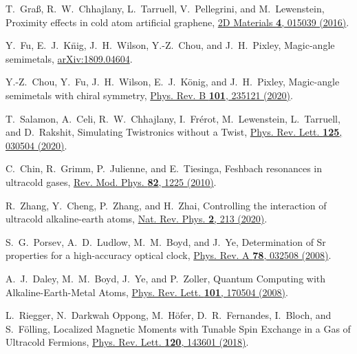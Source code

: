 \documentclass[twocolumn,english,prl,floatfix,citeautoscript,nofootinbib]{revtex4}
\begin{document}
\begin{thebibliography}{999}

 T.~Gra\ss {}, R.~W.~Chhajlany, L.~Tarruell,
V.~Pellegrini, and M.~Lewenstein, Proximity effects in cold atom artificial
graphene, \href{https://doi.org/10.1088/2053-1583/aa50c6}{2D Materials
\textbf{4}, 015039 (2016)}.

 Y.~Fu, E.~J.~K\"nig, J.~H.~Wilson, Y.-Z.~Chou,
and J.~H.~Pixley, Magic-angle semimetals, \href{https://arxiv.org/abs/1809.04604}%
{arXiv:1809.04604}.

 Y.-Z.~Chou, Y.~Fu, J.~H.~Wilson,
E.~J.~K\"onig, and J.~H.~Pixley, Magic-angle semimetals with chiral
symmetry, \href{https://doi.org/10.1103/PhysRevB.101.235121}{Phys. Rev. B
\textbf{101}, 235121 (2020)}.

 T.~Salamon, A.~Celi, R.~W.~Chhajlany,
I.~Fr\'erot, M.~Lewenstein, L.~Tarruell, and D.~Rakshit, Simulating
Twistronics without a Twist, \href{https://doi.org/10.1103/PhysRevLett.125.030504}%
{Phys. Rev. Lett. \textbf{125}, 030504 (2020)}.


 C.~Chin, R.~Grimm, P.~Julienne, and
E.~Tiesinga, Feshbach resonances in ultracold gases, \href{http://doi.org/10.1103/RevModPhys.82.1225}%
{Rev. Mod. Phys. \textbf{82}, 1225 (2010)}.

 R.~Zhang, Y.~Cheng, P.~Zhang, and H.~Zhai,
Controlling the interaction of ultracold alkaline-earth atoms, \href{http://doi.org/10.1038/s42254-020-0157-9}%
{Nat. Rev. Phys. \textbf{2}, 213 (2020)}.



 S.~G.~Porsev, A.~D.~Ludlow, M.~M.~Boyd, and
J.~Ye, Determination of Sr properties for a high-accuracy optical clock,
\href{https://doi.org/10.1103/PhysRevA.78.032508}{Phys. Rev. A \textbf{78},
032508 (2008)}.

 A.~J.~Daley, M.~M.~Boyd, J.~Ye, and
P.~Zoller, Quantum Computing with Alkaline-Earth-Metal Atoms, \href{https://doi.org/10.1103/PhysRevLett.101.170504}%
{Phys. Rev. Lett. \textbf{101}, 170504 (2008)}.

 L.~Riegger, N.~Darkwah Oppong, M.~H\"ofer,
D.~R.~Fernandes, I.~Bloch, and S.~F\"olling, Localized Magnetic Moments with
Tunable Spin Exchange in a Gas of Ultracold Fermions, \href{https://doi.org/10.1103/PhysRevLett.120.143601}%
{Phys. Rev. Lett. \textbf{120}, 143601 (2018)}.


\end{thebibliography}
\end{document}

